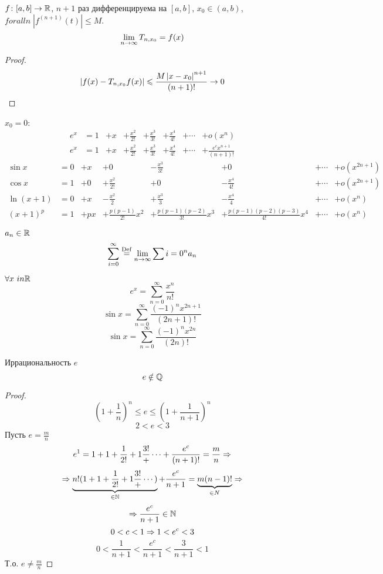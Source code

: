 \begin{conseq}
$f\colon [a, b] \rightarrow \mathbb{R}$, $n+1$ раз дифференцируема на $[a, b]$, $x_0 \in (a, b)$, $forall n\; \left|f^{(n+1)} (t)\right| \leqslant M$.
$$\lim_{n\rightarrow\infty} T_{n, x_0} = f(x)$$
\end{conseq}
\begin{proof}
$$\left|f(x) - T_{n, x_0} f(x)\right| \leqslant \frac{M \left|x-x_0\right|^{n+1}}{(n+1)!} \rightarrow 0$$
\end{proof}

$x_0 = 0$:
\begin{align*}
e^x &= 1 &+ x &+ \frac{x^2}{2!} &+ \frac{x^3}{3!} &+ \frac{x^4}{4!} &+ \cdots &+ o(x^n) \\
e^x &= 1 &+ x &+ \frac{x^2}{2!} &+ \frac{x^3}{3!} &+ \frac{x^4}{4!} &+ \cdots &+ \frac{e^cx^{n+1}}{(n+1)!}
\end{align*}
\begin{align*}
\sin x &= 0 &+ x &+ 0 &- \frac{x^3}{3!} &+ 0 &+ \cdots &+ o(x^{2n+1}) \\
\cos x &= 1 &+ 0 &+ \frac{x^2}{2!} &+ 0 &- \frac{x^4}{4!} &+ \cdots &+ o(x^{2n+1}) \\
\ln (x+1) &= 0 &+ x &- \frac{x^2}2 &+ \frac{x^3}3 &- \frac{x^4}4 &+ \cdots &+ o(x^n) \\
(x+1)^p &= 1 &+ px &+ \frac{p(p-1)}{2!}x^2 &+ \frac{p(p-1)(p-2)}{3!}x^3 &+ \frac{p(p-1)(p-2)(p-3)}{4!}x^4 &+ \cdots &+ o(x^n)
\end{align*}

\begin{Def}
$a_n \in \mathbb{R}$
$$\sum_{i=0}^\infty \stackrel{\mathrm{Def}}{=} \lim_{n\rightarrow\infty} \sum{i=0}^n a_n$$
\end{Def}

\begin{conseq}
$\forall x\ in \mathbb{R}\;$
$$e^x = \sum_{n=0}^\infty \frac{x^n}{n!}$$
$$\sin x = \sum_{n=0}^\infty \frac{(-1)^n x^{2n+1}}{(2n+1)!}$$
$$\sin x = \sum_{n=0}^\infty \frac{(-1)^n x^{2n}}{(2n)!}$$
\end{conseq}

\begin{theorem}{Иррациональность $e$}
$$e \notin \mathbb{Q}$$
\end{theorem}
\begin{proof}
$$\left(1+\frac1n\right)^n \leqslant e \leqslant \left(1+\frac1{n+1}\right)^n$$
$$2 < e < 3$$
Пусть $e = \frac{m}{n}$
$$e^1 = 1 + 1 + \frac1{2!} + 1\frac{3!} + \cdots + \frac{e^c}{(n+1)!} = \frac{m}{n} \Rightarrow$$
$$\Rightarrow \underbrace{n!(1 + 1 + \frac1{2!} + 1\frac{3!} + \cdots)}_{\in \mathbb{N}} + \frac{e^c}{n+1} = \underbrace{m(n-1)!}_{\in N} \Rightarrow$$
$$\Rightarrow \frac{e^c}{n+1} \in \mathbb{N}$$
$$0<c<1 \Rightarrow 1 < e^c < 3$$
$$0 < \frac{1}{n+1} < \frac{e^c}{n+1} < \frac{3}{n + 1} < 1$$
Т.о. $e \ne \frac{m}{n}$
\end{proof}

